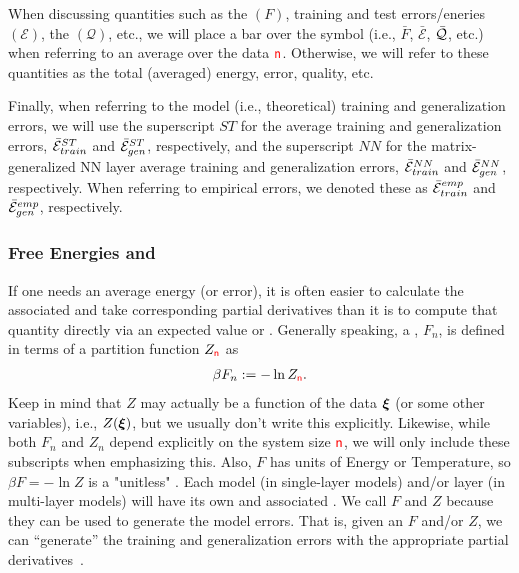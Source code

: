 When discussing quantities such as the \FreeEnergy $(F)$, 
training and test errors/eneries $(\mathcal{E})$, 
the \LayerQuality $(\mathcal{Q})$, etc.,
we will place a bar over the symbol (i.e., $\bar{F}$, $\bar{\mathcal{E}}$, $\bar{\mathcal{Q}}$, etc.) when referring to
an average over the data ${\color{red}\sf{n}}$.
Otherwise, we will refer to these quantities as the total (averaged) energy, error, quality, etc.


Finally, when referring to the model (i.e., theoretical)
training and generalization errors, we will use the superscript $ST$ for
the average \StudentTeacher training and generalization errors, $\bar{\mathcal{E}}^{ST}_{train}$ and $\bar{\mathcal{E}}^{ST}_{gen}$, respectively, and
the superscript $NN$ for the matrix-generalized NN layer average
training and generalization errors, $\bar{\mathcal{E}}^{NN}_{train}$ and $\bar{\mathcal{E}}^{NN}_{gen}$, respectively.
When referring to empirical errors, we denoted these as $\bar{\mathcal{E}}^{emp}_{train}$ and $\bar{\mathcal{E}}^{emp}_{gen}$, respectively.


\subsubsection{Free Energies and \GeneratingFunctions} 
\label{sxn:mathP_free_energies}


If one needs an average energy (or error), 
it is often easier to calculate the associated \FreeEnergy and take corresponding partial derivatives
than it is to compute that quantity directly via an expected value or \ThermalAverage.
Generally speaking, a \FreeEnergy, $F_n$, is defined in terms of a partition function $Z_{{\color{red}\sf{n}}}$ as
\begin{align}
\label{eqn:F}
\beta F_n:=-\ln Z_{{\color{red}\sf{n}}}.
\end{align}
Keep in mind that $Z$ may actually be a function of the data $\boldsymbol{\xi}$ (or some other variables),
i.e., $Z(\boldsymbol{\xi})$, but we usually don't write this explicitly.
Likewise, while  both $F_n$ and $Z_n$ depend explicitly on the system size ${\color{red}\sf{n}}$,
we will only include these subscripts when emphasizing this.
Also, $F$ has units of Energy or Temperature, so $\beta F=-\ln Z$ is a "unitless" \FreeEnergy.
%
Each model (in single-layer models) and/or layer (in multi-layer models) will have its own \PartitionFunction and associated \GeneratingFunctions.
We call $F$ and $Z$ \emph{\GeneratingFunctions} because they can be used to generate the model errors. 
That is, given an $F$ and/or $Z$, we can ``generate'' the training and generalization errors with the appropriate partial derivatives~\cite{LTS90, Solla2023}.

